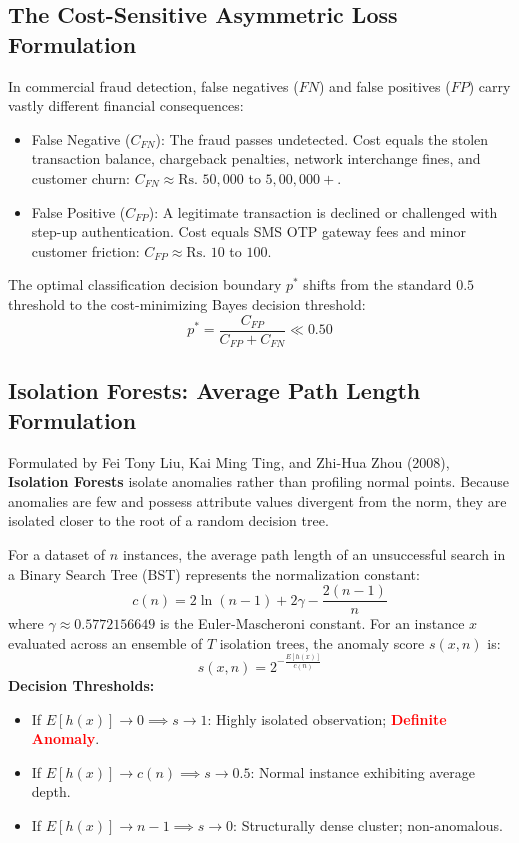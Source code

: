 \subsection{The Cost-Sensitive Asymmetric Loss Formulation}
In commercial fraud detection, false negatives ($FN$) and false positives ($FP$) carry vastly different financial consequences:
\begin{itemize}
    \item False Negative ($C_{FN}$): The fraud passes undetected. Cost equals the stolen transaction balance, chargeback penalties, network interchange fines, and customer churn: $C_{FN} \approx \text{Rs.~} 50{,}000$ to $5{,}00{,}000+$.
    \item False Positive ($C_{FP}$): A legitimate transaction is declined or challenged with step-up authentication. Cost equals SMS OTP gateway fees and minor customer friction: $C_{FP} \approx \text{Rs.~} 10$ to $100$.
\end{itemize}
The optimal classification decision boundary $p^*$ shifts from the standard $0.5$ threshold to the cost-minimizing Bayes decision threshold:
\begin{equation}
p^* = \frac{C_{FP}}{C_{FP} + C_{FN}} \ll 0.50
\label{eq:bayes_threshold}
\end{equation}

\subsection{Isolation Forests: Average Path Length Formulation}
Formulated by Fei Tony Liu, Kai Ming Ting, and Zhi-Hua Zhou (2008), \textbf{Isolation Forests} isolate anomalies rather than profiling normal points. Because anomalies are few and possess attribute values divergent from the norm, they are isolated closer to the root of a random decision tree.

For a dataset of $n$ instances, the average path length of an unsuccessful search in a Binary Search Tree (BST) represents the normalization constant:
\begin{equation}
c(n) = 2 \ln(n - 1) + 2\gamma - \frac{2(n - 1)}{n}
\label{eq:bst_constant}
\end{equation}
where $\gamma \approx 0.5772156649$ is the Euler-Mascheroni constant.
For an instance $x$ evaluated across an ensemble of $T$ isolation trees, the anomaly score $s(x, n)$ is:
\begin{equation}
s(x, n) = 2^{-\frac{E[h(x)]}{c(n)}}
\label{eq:isolation_score}
\end{equation}
\textbf{Decision Thresholds:}
\begin{itemize}
    \item If $E[h(x)] \to 0 \implies s \to 1$: Highly isolated observation; \textcolor{red}{\textbf{Definite Anomaly}}.
    \item If $E[h(x)] \to c(n) \implies s \to 0.5$: Normal instance exhibiting average depth.
    \item If $E[h(x)] \to n - 1 \implies s \to 0$: Structurally dense cluster; non-anomalous.
\end{itemize}

